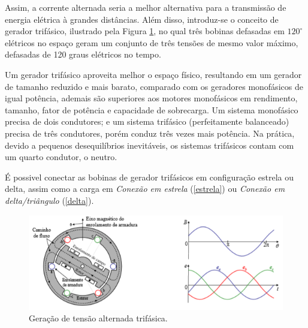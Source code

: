 \documentclass[a4paper,12pt,oneside,openany,table,xcdraw]{article}
\begin{document}
Assim, a corrente alternada seria a melhor alternativa para a transmissão de energia elétrica à grandes distâncias. Além disso, introduz-se o conceito de gerador trifásico, ilustrado pela Figura \ref{gerador}, no qual três bobinas defasadas em $120^\circ $ elétricos no espaço geram um conjunto de três tensões de mesmo valor máximo, defasadas de 120 graus elétricos no tempo.

Um gerador trifásico aproveita melhor o espaço físico, resultando em um gerador de tamanho reduzido e mais barato, comparado com os geradores monofásicos de igual potência, ademais são superiores aos motores monofásicos em rendimento, tamanho, fator de potência e capacidade de sobrecarga.
Um sistema monofásico precisa de dois condutores; e um sistema trifásico (perfeitamente balanceado) precisa de três condutores, porém conduz três vezes mais potência. Na prática, devido a pequenos desequilíbrios inevitáveis, os sistemas trifásicos contam com um quarto condutor, o neutro.

É possivel conectar as bobinas de gerador trifásicos em configuração estrela ou delta, assim como a carga em \emph{Conexão em estrela} (\ref{estrela}) ou  \emph{Conexão em delta/triângulo} (\ref{delta}).
\begin{figure}[H]
\centering
\captionsetup{font=scriptsize}
\includegraphics[width=14.5cm]{motor3phi}
\caption{Geração de tensão alternada trifásica.}
\label{gerador}
\end{figure}
\end{document}
